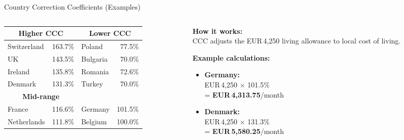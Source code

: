 \documentclass[aspectratio=169]{beamer}
\newcommand{\eur}[1]{EUR\,#1}
\newcommand{\highlight}[1]{\textcolor{euBlue}{\textbf{#1}}}
\begin{document}
\begin{frame}{Country Correction Coefficients (Examples)}
\renewcommand{\arraystretch}{1.15}
\begin{columns}[T]
\begin{column}{0.50\textwidth}
\footnotesize
\begin{tabular}{@{}l r@{\quad}l r@{}}
  \toprule
  \multicolumn{2}{c}{\textbf{Higher CCC}} & \multicolumn{2}{c}{\textbf{Lower CCC}} \\
  \midrule
  Switzerland & 163.7\% & Poland    & 77.5\% \\
  UK          & 143.5\% & Bulgaria  & 70.0\% \\
  Ireland     & 135.8\% & Romania   & 72.6\% \\
  Denmark     & 131.3\% & Turkey    & 70.0\% \\
  \midrule
  \multicolumn{2}{c}{\textbf{Mid-range}} & \multicolumn{2}{c}{} \\
  \midrule
  France      & 116.6\% & Germany   & 101.5\% \\
  Netherlands & 111.8\% & Belgium   & 100.0\% \\
  \bottomrule
\end{tabular}
\end{column}
\begin{column}{0.46\textwidth}
\textbf{How it works:}\\[4pt]
CCC adjusts the \eur{4,250} living allowance to local cost of living.
\vspace{8pt}

\textbf{Example calculations:}
\begin{itemize}
  \item \textbf{Germany:}\\
        \eur{4,250} $\times$ 101.5\%\\= \highlight{\eur{4,313.75}}/month
  \item \textbf{Denmark:}\\
        \eur{4,250} $\times$ 131.3\%\\= \highlight{\eur{5,580.25}}/month
\end{itemize}
\end{column}
\end{columns}
\end{frame}
\end{document}
